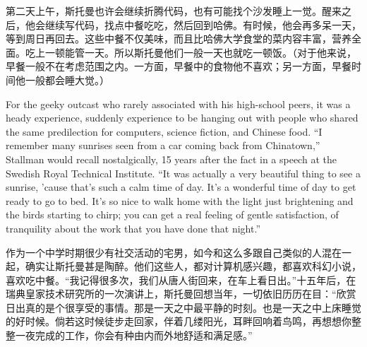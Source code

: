 \ifdefined\chs
第二天上午，斯托曼也许会继续折腾代码，也有可能找个沙发睡上一觉。醒来之后，他会继续写代码，找点中餐吃吃，然后回到哈佛。有时候，他会再多呆一天，等到周日再回去。这些中餐不仅美味，而且比哈佛大学食堂的菜内容丰富，营养全面。吃上一顿能管一天。所以斯托曼他们一般一天也就吃一顿饭。（对于他来说，早餐一般不在考虑范围之内。一方面，早餐中的食物他不喜欢；另一方面，早餐时间他一般都会睡大觉。）
\fi
\fi

\ifdefined\eng
For the geeky outcast who rarely associated with his high-school peers, it was a heady \ifdefined\vone experience, suddenly \fi\ifdefined\vtwo experience to be \fi hanging out with people who shared the same predilection for computers, science fiction, and Chinese food. ``I remember many sunrises seen from a car coming back from Chinatown,'' Stallman would recall nostalgically, 15 years after the fact in a speech at the Swedish Royal Technical Institute. ``It was actually a very beautiful thing to see a sunrise, 'cause that's such a calm time of day. It's a wonderful time of day to get ready to go to bed. It's so nice to walk home with the light just brightening and the birds starting to chirp; you can get a real feeling of gentle satisfaction, of tranquility about the work that you have done that night.''
\fi

\ifdefined\chs
作为一个中学时期很少有社交活动的宅男，如今和这么多跟自己类似的人混在一起，确实让斯托曼甚是陶醉。他们这些人，都对计算机感兴趣，都喜欢科幻小说，喜欢吃中餐。``我记得很多次，我们从唐人街回来，在车上看日出。''十五年后，在瑞典皇家技术研究所的一次演讲上，斯托曼回想当年，一切依旧历历在目：``欣赏日出真的是个很享受的事情。那是一天之中最平静的时刻。也是一天之中上床睡觉的好时候。倘若这时候徒步走回家，伴着几缕阳光，耳畔回响着鸟鸣，再想想你整整一夜完成的工作，你会有种由内而外地舒适和满足感。''
\fi

